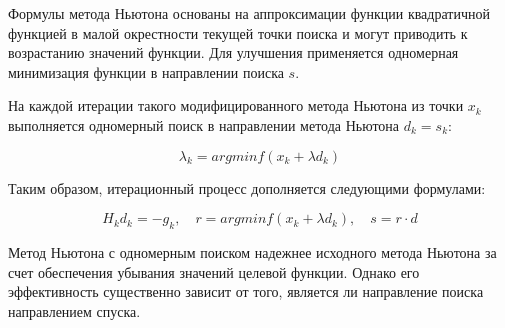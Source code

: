 \documentclass[12pt]{article}
\begin{document}
Формулы метода Ньютона основаны на аппроксимации функции квадратичной функцией в малой окрестности текущей точки поиска и могут приводить к возрастанию значений функции. Для улучшения применяется одномерная минимизация функции в направлении поиска $s$.

На каждой итерации такого модифицированного метода Ньютона из точки $x_k$ выполняется одномерный поиск в направлении метода Ньютона $d_k = s_k$:

\[ \lambda_k = arg min f(x_k+\lambda d_k) \]

Таким образом, итерационный процесс дополняется следующими формулами:

\[ H_k d_k = -g_k, \quad r = arg min f(x_k+\lambda d_k), \quad s = r \cdot d \]

Метод Ньютона с одномерным поиском надежнее исходного метода Ньютона за счет обеспечения убывания значений целевой функции. Однако его эффективность существенно зависит от того, является ли направление поиска направлением спуска.
\end{document}
